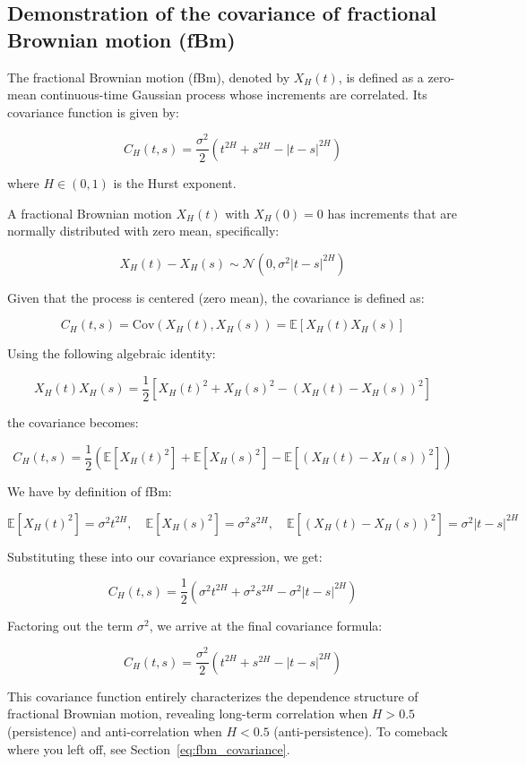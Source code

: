 \documentclass[11pt]{extarticle}
\begin{document}
\FloatBarrier

\subsection{Demonstration of the covariance of fractional Brownian motion (fBm)}
\label{sec:covariance_fbm}

The fractional Brownian motion (fBm), denoted by \( X_H(t) \), is defined as a zero-mean continuous-time Gaussian process whose increments are correlated. Its covariance function is given by:

\[
C_H(t,s) = \frac{\sigma^2}{2}\left(t^{2H}+s^{2H}-|t-s|^{2H}\right)
\]

where \( H \in (0,1) \) is the Hurst exponent.

A fractional Brownian motion \( X_H(t) \) with \( X_H(0)=0 \) has increments that are normally distributed with zero mean, specifically:

\[
X_H(t)-X_H(s) \sim \mathcal{N}(0,\sigma^2|t-s|^{2H})
\]

Given that the process is centered (zero mean), the covariance is defined as:

\[
C_H(t,s) = \text{Cov}(X_H(t), X_H(s)) = \mathbb{E}[X_H(t)X_H(s)]
\]

Using the following algebraic identity:

\[
X_H(t)X_H(s) = \frac{1}{2}\left[X_H(t)^2 + X_H(s)^2 - (X_H(t)-X_H(s))^2\right]
\]

the covariance becomes:

\[
C_H(t,s) = \frac{1}{2}\left(\mathbb{E}[X_H(t)^2]+\mathbb{E}[X_H(s)^2]-\mathbb{E}[(X_H(t)-X_H(s))^2]\right)
\]


We have by definition of fBm:

\[
\mathbb{E}[X_H(t)^2] = \sigma^2 t^{2H}, \quad \mathbb{E}[X_H(s)^2] = \sigma^2 s^{2H}, \quad \mathbb{E}[(X_H(t)-X_H(s))^2] = \sigma^2 |t-s|^{2H}
\]

Substituting these into our covariance expression, we get:

\[
C_H(t,s) = \frac{1}{2}\left(\sigma^2 t^{2H} + \sigma^2 s^{2H} - \sigma^2 |t-s|^{2H}\right)
\]


Factoring out the term \( \sigma^2 \), we arrive at the final covariance formula:

\[
\boxed{C_H(t,s) = \frac{\sigma^2}{2}\left(t^{2H} + s^{2H} - |t-s|^{2H}\right)}
\]

This covariance function entirely characterizes the dependence structure of fractional Brownian motion, revealing long-term correlation when \(H>0.5\) (persistence) and anti-correlation when \(H<0.5\) (anti-persistence).
To comeback where you left off, see Section~\ref{eq:fbm_covariance}. \\
\end{document}
